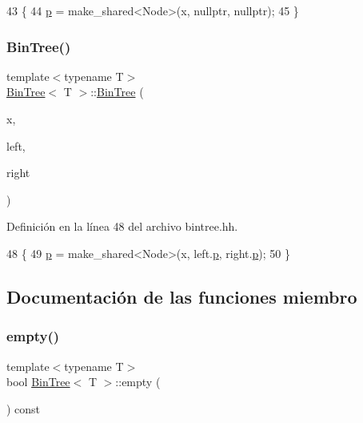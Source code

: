 \begin{DoxyCode}
43                          \{
44         \hyperlink{class_bin_tree_afe3647af1dda90f6ddf1deee6560fcf1}{p} = make\_shared<Node>(x, \textcolor{keyword}{nullptr}, \textcolor{keyword}{nullptr});
45     \}
\end{DoxyCode}
\mbox{\label{class_bin_tree_adb7eeff76d08130c943b36af215eb521}} 
\subsubsection{\texorpdfstring{Bin\+Tree()}{BinTree()}\hspace{0.1cm}{\footnotesize\ttfamily [4/4]}}
{\footnotesize\ttfamily template$<$typename T$>$ \\
\hyperlink{class_bin_tree}{Bin\+Tree}$<$ T $>$\+::\hyperlink{class_bin_tree}{Bin\+Tree} (\begin{DoxyParamCaption}\item[{const T \&}]{x,  }\item[{const \hyperlink{class_bin_tree}{Bin\+Tree}$<$ T $>$ \&}]{left,  }\item[{const \hyperlink{class_bin_tree}{Bin\+Tree}$<$ T $>$ \&}]{right }\end{DoxyParamCaption})}



Definición en la línea 48 del archivo bintree.\+hh.


\begin{DoxyCode}
48                                                                     \{
49         \hyperlink{class_bin_tree_afe3647af1dda90f6ddf1deee6560fcf1}{p} = make\_shared<Node>(x, left.\hyperlink{class_bin_tree_afe3647af1dda90f6ddf1deee6560fcf1}{p}, right.\hyperlink{class_bin_tree_afe3647af1dda90f6ddf1deee6560fcf1}{p});
50     \}
\end{DoxyCode}


\subsection{Documentación de las funciones miembro}
\mbox{\label{class_bin_tree_a74cda259ba5c25b8ee38ed4dc33e4fad}} 
\subsubsection{\texorpdfstring{empty()}{empty()}}
{\footnotesize\ttfamily template$<$typename T$>$ \\
bool \hyperlink{class_bin_tree}{Bin\+Tree}$<$ T $>$\+::empty (\begin{DoxyParamCaption}{ }\end{DoxyParamCaption}) const}



